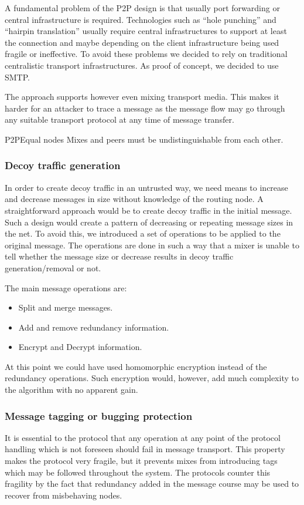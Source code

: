 A fundamental problem of the P2P design is that usually port forwarding or central infrastructure is required. Technologies such as ``hole punching'' and ``hairpin translation'' usually require central infrastructures to support at least the connection and maybe depending on the client infrastructure being used fragile or ineffective. To avoid these problems we decided to rely on traditional centralistic transport infrastructures. As proof of concept, we decided to use SMTP. 

The approach supports however even mixing transport media. This makes it harder for an attacker to trace a message as the message flow may go through any suitable transport protocol at any time of message transfer.

\begin{requirement}{P2P}{Equal nodes}
	Mixes and peers must be undistinguishable from each other. 
\end{requirement}

\subsubsection{Decoy traffic generation}
In order to create decoy traffic in an untrusted way, we need means to increase and decrease messages in size without knowledge of the routing node. A straightforward approach would be to create decoy traffic in the initial message. Such a design would create a pattern of decreasing or repeating message sizes in the net. To avoid this, we introduced a set of operations to be applied to the original message. The operations are done in such a way that a mixer is unable to tell whether the message size or decrease results in decoy traffic generation/removal or not.

The main message operations are:
\begin{itemize}
	\item Split and merge messages.
	\item Add and remove redundancy information.
	\item Encrypt and Decrypt information.
\end{itemize}

At this point we could have used homomorphic encryption instead of the redundancy operations. Such encryption would, however, add much complexity to the algorithm with no apparent gain.

\subsubsection{Message tagging or bugging protection}
It is essential to the protocol that any operation at any point of the protocol handling which is not foreseen should fail in message transport. This property makes the protocol very fragile, but it prevents mixes from introducing tags which may be followed throughout the system. The protocols counter this fragility by the fact that redundancy added in the message course may be used to recover from misbehaving nodes.

